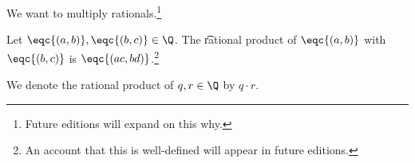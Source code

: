 

We want to multiply rationals.\footnote{Future editions will expand on this why.}


Let $\eqc{(a, b)}, \eqc{(b, c)} \in \Q$.
The \t{rational product} of $\eqc{(a, b)}$ with $\eqc{(b, c)}$ is $\eqc{(ac , bd)}$.\footnote{An account that this is well-defined will appear in future editions.}


We denote the rational product of $q, r \in \Q$ by $q \cdot r$.

\blankpage

